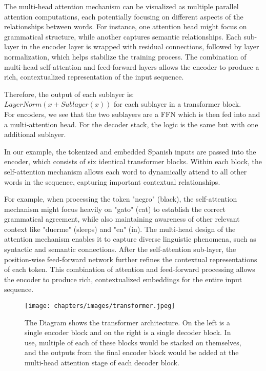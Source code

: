 The multi-head attention mechanism can be visualized as multiple parallel attention computations, each potentially focusing on different aspects of the relationships between words. For instance, one attention head might focus on grammatical structure, while another captures semantic relationships. Each sub-layer in the encoder layer is wrapped with residual connections, followed by layer normalization, which helps stabilize the training process. The combination of multi-head self-attention and feed-forward layers allows the encoder to produce a rich, contextualized representation of the input sequence. 

Therefore, the output of each sublayer is: \\
	\tab$LayerNorm(x + Sublayer(x))$ for each sublayer in a transformer block. \\
For encoders, we see that the two sublayers are a FFN which is then fed into and a multi-attention head. For the decoder stack, the logic is the same but with one additional sublayer. 

In our example, the tokenized and embedded Spanish inputs are passed into the encoder, which consists of six identical transformer blocks. Within each block, the self-attention mechanism allows each word to dynamically attend to all other words in the sequence, capturing important contextual relationships.

For example, when processing the token "negro" (black), the self-attention mechanism might focus heavily on "gato" (cat) to establish the correct grammatical agreement, while also maintaining awareness of other relevant context like "duerme" (sleeps) and "en" (in). The multi-head design of the attention mechanism enables it to capture diverse linguistic phenomena, such as syntactic and semantic connections. After the self-attention sub-layer, the position-wise feed-forward network further refines the contextual representations of each token. This combination of attention and feed-forward processing allows the encoder to produce rich, contextualized embeddings for the entire input sequence.

\begin{figure}[h!]
    \centering
    \texttt{[image: chapters/images/transformer.jpeg]} 
    \caption {The Diagram shows the transformer architecture. \cite{NIPS2017_3f5ee243} On the left is a single encoder block and on the right is a single decoder block. In use, multiple of each of these blocks would be stacked on themselves, and the outputs from the final encoder block would be added at the multi-head attention stage of each decoder block.}
\end{figure}

